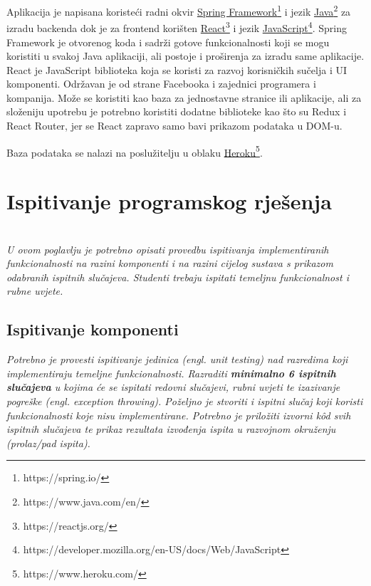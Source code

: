			\textit{}Aplikacija je napisana koristeći radni okvir \underline{Spring Framework}\footnote[9]{https://spring.io/} i jezik \underline{Java}\footnote[10]{https://www.java.com/en/} za izradu backenda dok je za frontend korišten \underline{React}\footnote[11]{https://reactjs.org/} i jezik \underline{JavaScript}\footnote[12]{https://developer.mozilla.org/en-US/docs/Web/JavaScript}. Spring Framework je otvorenog koda i sadrži gotove funkcionalnosti koji se mogu koristiti u svakoj Java aplikaciji, ali postoje i proširenja za izradu same aplikacije. React je JavaScript biblioteka koja se koristi za razvoj korisničkih sučelja i UI komponenti. Održavan je  od strane Facebooka i zajednici programera i kompanija. Može se koristiti kao baza za jednostavne stranice ili aplikacije, ali za složeniju upotrebu je potrebno koristiti dodatne biblioteke kao što su Redux i React Router, jer se React zapravo samo bavi prikazom podataka u DOM-u.
			
			\textit{}Baza podataka se nalazi na poslužitelju u oblaku \underline{Heroku}\footnote[13]{https://www.heroku.com/}.
			
			\eject 
		
	
		\section{Ispitivanje programskog rješenja}
			
			\textbf{}\\
			
			 \textit{U ovom poglavlju je potrebno opisati provedbu ispitivanja implementiranih funkcionalnosti na razini komponenti i na razini cijelog sustava s prikazom odabranih ispitnih slučajeva. Studenti trebaju ispitati temeljnu funkcionalnost i rubne uvjete.}
	
			
			\subsection{Ispitivanje komponenti}
			\textit{Potrebno je provesti ispitivanje jedinica (engl. unit testing) nad razredima koji implementiraju temeljne funkcionalnosti. Razraditi \textbf{minimalno 6 ispitnih slučajeva} u kojima će se ispitati redovni slučajevi, rubni uvjeti te izazivanje pogreške (engl. exception throwing). Poželjno je stvoriti i ispitni slučaj koji koristi funkcionalnosti koje nisu implementirane. Potrebno je priložiti izvorni kôd svih ispitnih slučajeva te prikaz rezultata izvođenja ispita u razvojnom okruženju (prolaz/pad ispita). }
			
